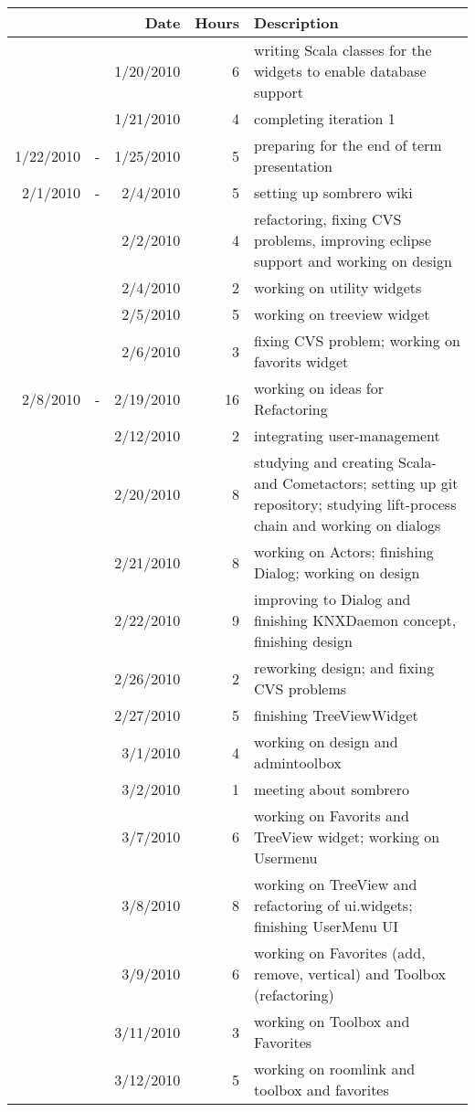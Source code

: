 \begin{tabular}{| r c r | r | p{9cm} |}
& & Date & Hours & Description \\
\hline
	&		&	1/20/2010	&	6	&	writing Scala classes for the widgets to enable database support \\
	&		&	1/21/2010	&	4	&	completing iteration 1 \\
1/22/2010	&	-	&	1/25/2010	&	5	&	preparing for the end of term presentation \\
2/1/2010	&	-	&	2/4/2010	&	5	&	setting up sombrero wiki \\
	&		&	2/2/2010	&	4	&	refactoring, fixing CVS problems, improving eclipse support and working on design \\
	&		&	2/4/2010	&	2	&	working on utility widgets \\
	&		&	2/5/2010	&	5	&	working on treeview widget \\
	&		&	2/6/2010	&	3	&	fixing CVS problem; working on favorits widget \\
2/8/2010	&	-	&	2/19/2010	&	16	&	working on ideas for Refactoring \\
	&		&	2/12/2010	&	2	&	integrating user-management \\
	&		&	2/20/2010	&	8	&	studying and creating Scala- and Cometactors; setting up git repository; studying lift-process chain and working on dialogs \\
	&		&	2/21/2010	&	8	&	working on Actors; finishing Dialog; working on design \\
	&		&	2/22/2010	&	9	&	improving to Dialog and finishing KNXDaemon concept, finishing design \\
	&		&	2/26/2010	&	2	&	reworking design; and fixing CVS problems \\
	&		&	2/27/2010	&	5	&	finishing TreeViewWidget \\
	&		&	3/1/2010	&	4	&	working on design and admintoolbox \\
	&		&	3/2/2010	&	1	&	meeting about sombrero \\
	&		&	3/7/2010	&	6	&	working on Favorits and TreeView widget; working on Usermenu \\
	&		&	3/8/2010	&	8	&	working on TreeView and refactoring of ui.widgets; finishing UserMenu UI \\
	&		&	3/9/2010	&	6	&	working on Favorites (add, remove, vertical) and Toolbox (refactoring) \\
	&		&	3/11/2010	&	3	&	working on Toolbox and Favorites \\
	&		&	3/12/2010	&	5	&	working on roomlink and toolbox and favorites \\

\end{tabular}
